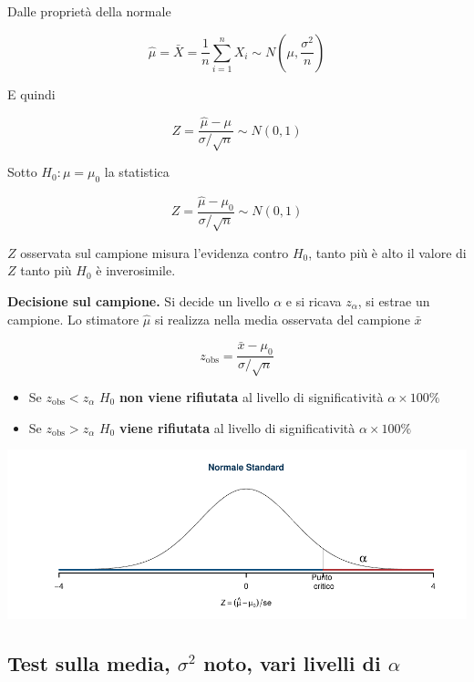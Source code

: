 \documentclass[
  11pt,
]{book}
\providecommand{\tightlist}{%
  \setlength{\itemsep}{0pt}\setlength{\parskip}{0pt}}
\theoremstyle{mytheoremstyle}
\theoremstyle{mydefstyle}
\begin{document}
Dalle proprietà della normale

\[\hat\mu=\bar X=\frac 1 n\sum_{i=1}^nX_i\sim N\left(\mu,\frac{\sigma^2} {n}\right)\]

E quindi

\[Z=\frac{\hat\mu-\mu}{\sigma/\sqrt n}\sim N(0,1)\]

Sotto \(H_0: \mu=\mu_0\) la statistica

\[Z=\frac{\hat\mu-\mu_0}{\sigma/\sqrt n}\sim N(0,1)\]

\(Z\) osservata sul campione misura l'evidenza contro \(H_0\), tanto più è
alto il valore di \(Z\) tanto più \(H_0\) è inverosimile.

\begin{info}

\textbf{Decisione sul campione.} Si decide un livello \(\alpha\) e si ricava
\(z_\alpha\), si estrae un campione. Lo stimatore \(\hat\mu\) si realizza
nella media osservata del campione \(\bar x\)

\[z_{\text{obs}}=\frac{\bar x -\mu_0}{\sigma/\sqrt n}\]

\begin{itemize}
\tightlist
\item
  Se \(z_{\text{obs}}<z_\alpha\) \(H_0\) \textbf{non viene rifiutata} al
  livello di significatività \(\alpha\times100\%\)
\item
  Se \(z_{\text{obs}}>z_\alpha\) \(H_0\) \textbf{viene rifiutata} al livello di
  significatività \(\alpha\times100\%\)
\end{itemize}

\begin{center}\includegraphics{Appunti_di_Statistica_2025_files/figure-latex/15-test-mu-pi-14-1} \end{center}

\end{info}

\subsection{\texorpdfstring{Test sulla media, \(\sigma^2\) noto, vari livelli di \(\alpha\)}{Test sulla media, \textbackslash sigma\^{}2 noto, vari livelli di \textbackslash alpha}}\label{test-sulla-media-sigma2-noto-vari-livelli-di-alpha}
\end{document}
